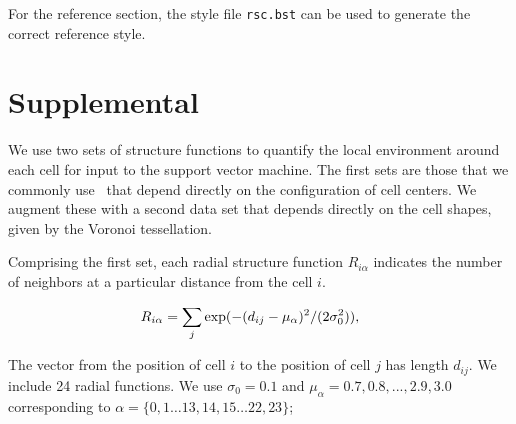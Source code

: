 \documentclass[twoside,twocolumn,9pt]{article}
\begin{document}

For the reference section, the style file \texttt{rsc.bst} can be used to generate the correct reference style.

\section{Supplemental}

We use two sets of structure functions to quantify the local environment around each cell for input to the support vector machine. The first sets are those that we commonly use~\cite{BehlerParinello2007} that depend directly on the configuration of cell centers. We augment these  with a second data set that depends directly on the cell shapes, given by the Voronoi tessellation.

Comprising the first set, each radial structure function $R_{i\alpha}$ indicates the number of neighbors at a particular distance from the cell $i$. 

\begin{equation*}
R_{i\alpha} = \sum_j \text{exp}(-(d_{ij} - \mu_{\alpha})^2/(2\sigma_0^2))
\text{,\hspace{5mm}}
\end{equation*}


The vector from the position of cell $i$ to the position of cell $j$ has length $d_{ij}$. 
We include 24 radial functions. %
We use $\sigma_0=0.1$ and $\mu_\alpha = 0.7,0.8,...,2.9,3.0$ corresponding to $\alpha = \{ 0,1 \ldots 13,14,15 \ldots 22,23 \}$;
\end{document}
